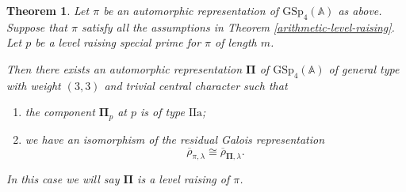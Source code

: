 \documentclass[10pt]{amsart}
\numberwithin{equation}{section}
\newtheorem{theorem}[equation]{Theorem}
\theoremstyle{definition}
\def\GSp{\mathrm{GSp}}
\def\rma{\mathrm{a}}
\def\rmI{\mathrm{I}}
\begin{document}
\begin{theorem}
Let $\pi$ be an automorphic representation of $\GSp_{4}(\mathbb{A})$ as above. Suppose that $\pi$ satisfy all the assumptions in Theorem \ref{arithmetic-level-raising}. Let $p$ be a level raising special prime for $\pi$ of length $m$. 

Then there exists an automorphic representation $\mathbf{\Pi}$ of $\GSp_{4}(\mathbb{A})$ of general type with weight $(3,3)$ and trivial central character such that
\begin{enumerate}
\item the component $\mathbf{\Pi}_{p}$ at $p$ is of type $\rmI\rmI\rma$;
\item we have an isomorphism of the residual Galois representation
\begin{equation*}
\overline{\rho}_{\pi, \lambda}\cong \overline{\rho}_{\mathbf{\Pi}, \lambda}.
\end{equation*}
\end{enumerate}
In this case we will say $\mathbf{\Pi}$ is a level raising of $\pi$. 
\end{theorem}
\end{document}

